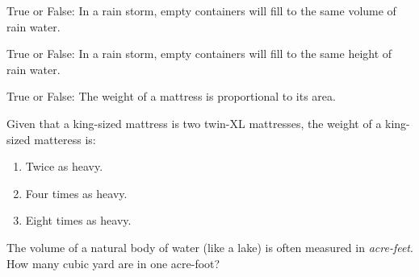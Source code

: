 \documentclass[noauthor,nooutcomes]{ximera}
\author{Bart Snapp}
\begin{document}
\maketitle


\begin{exercise}
  True or False: In a rain storm, empty containers will fill to the same volume of rain water.
\end{exercise}



\begin{exercise}
  True or False: In a rain storm, empty containers will fill to the same height of rain water.
\end{exercise}


\begin{exercise}
  True or False: The weight of a mattress is proportional to its area.
\end{exercise}



\begin{exercise}
  Given that a king-sized mattress is two twin-XL mattresses, the weight of a king-sized matteress is:
  \begin{enumerate}
  \item Twice as heavy.
  \item Four times as heavy.
  \item Eight times as heavy.
  \end{enumerate}
\end{exercise}


\begin{exercise}
  The volume of a natural body of water (like a lake)  is often measured in
  \textit{acre-feet}. How many cubic yard are in one acre-foot?
\end{exercise}







\end{document}
